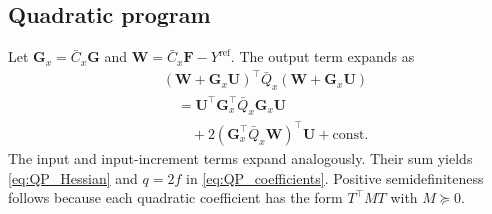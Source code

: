 \documentclass[journal]{IEEEtran}
\newcommand{\mF}{\mathbf{F}}
\newcommand{\mG}{\mathbf{G}}
\newcommand{\mU}{\mathbf{U}}
\newcommand{\mW}{\mathbf{W}}
\begin{document}
\subsection*{Quadratic program}
Let $\mG_x=\bar C_x\mG$ and $\mW=\bar C_x\mF-Y^{\mathrm{ref}}$. The output term expands as
\begin{equation}
    \begin{aligned}
    &(\mW+\mG_x\mU)^\top\bar Q_x(\mW+\mG_x\mU)\\
    &\quad=\mU^\top\mG_x^\top\bar Q_x\mG_x\mU\\
    &\qquad+2(\mG_x^\top\bar Q_x\mW)^\top\mU+\mathrm{const}.
    \end{aligned}
\end{equation}
The input and input-increment terms expand analogously. Their sum yields \eqref{eq:QP_Hessian} and $q=2f$ in \eqref{eq:QP_coefficients}. Positive semidefiniteness follows because each quadratic coefficient has the form $T^\top MT$ with $M\succeq0$.
\end{document}
